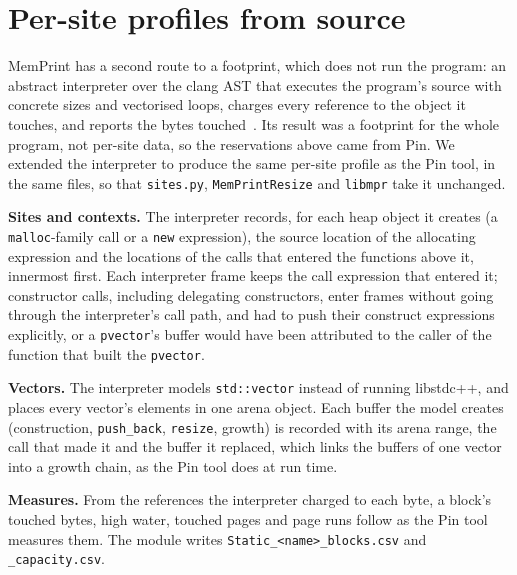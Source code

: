 \documentclass[11pt]{article}
\newcommand{\memprint}{MemPrint}
\newcommand{\libmpr}{\texttt{libmpr}}
\newcommand{\pass}{\texttt{MemPrintResize}}
\begin{document}
\section{Per-site profiles from source}
\label{sec:static}

\memprint{} has a second route to a footprint, which does not run the program: an abstract interpreter over the
clang AST that executes the program's source with concrete sizes and vectorised loops, charges every reference
to the object it touches, and reports the bytes touched~\cite{memprintstatic}. Its result was a footprint for the whole
program, not per-site data, so the reservations above came from Pin. We extended the interpreter to produce the
same per-site profile as the Pin tool, in the same files, so that \texttt{sites.py}, \pass{} and \libmpr{} take it
unchanged.

\textbf{Sites and contexts.} The interpreter records, for each heap object it creates (a \texttt{malloc}-family
call or a \texttt{new} expression), the source location of the allocating expression and the locations of the
calls that entered the functions above it, innermost first. Each interpreter frame keeps the call expression that
entered it; constructor calls, including delegating constructors, enter frames without going through the
interpreter's call path, and had to push their construct expressions explicitly, or a \texttt{pvector}'s buffer
would have been attributed to the caller of the function that built the \texttt{pvector}.

\textbf{Vectors.} The interpreter models \texttt{std::vector} instead of running libstdc++, and places every
vector's elements in one arena object. Each buffer the model creates (construction, \texttt{push\_back},
\texttt{resize}, growth) is recorded with its arena range, the call that made it and the buffer it replaced, which
links the buffers of one vector into a growth chain, as the Pin tool does at run time.

\textbf{Measures.} From the references the interpreter charged to each byte, a block's touched bytes, high water,
touched pages and page runs follow as the Pin tool measures them. The module writes
\texttt{Static\_<name>\_blocks.csv} and \texttt{\_capacity.csv}.
\end{document}
